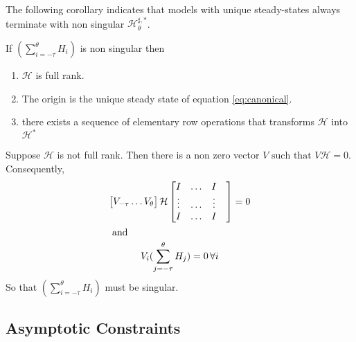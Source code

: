 \documentclass{elsart}
\begin{document}
The following corollary indicates that models 
with unique steady-states always terminate with non singular $\mathcal{H}^{\sharp,\ast}_{\theta}$.

\begin{crrlry}
If $  ( {\sum_{i= - \tau}^\theta { H_i}} )$ is non singular 
then
\begin{enumerate} 
\item $\mathcal{H}$ is full rank.
\item The origin is the unique steady state of equation \ref{eq:canonical}.
\item there exists a sequence of elementary row
operations that transforms $\mathcal{H}$ into $\mathcal{H}^\ast$
\end{enumerate} 
\end{crrlry}
\begin{prf}
  Suppose
$\mathcal{H}$ is not full rank.
 Then there is
a non zero vector $V \text{ such that } V \mathcal{H}  =0$. Consequently,
\begin{gather}
  \begin{bmatrix}
    V_{-\tau}\ldots V_{\theta}
  \end{bmatrix}
 \mathcal{H}  
 \begin{bmatrix}
   I&\ldots&I\\
\vdots&\ldots&\vdots\\
I&\ldots&I&\\
 \end{bmatrix}=0\\ \intertext{ and }
V_i  ({\sum_{j= - \tau}^\theta { H_j}})=0 \, \forall i
\end{gather}
So that $ ({\sum_{i= - \tau}^\theta { H_i}})$ must be singular.
\end{prf}




\subsection{Asymptotic Constraints}
\label{sec:asymproof}
\end{document}

